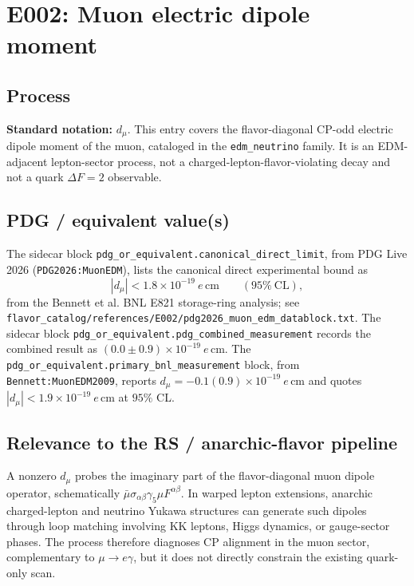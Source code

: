 
\section{E002: Muon electric dipole moment}

\subsection*{Process}
\textbf{Standard notation:} \(d_\mu\).  This entry covers the flavor-diagonal
CP-odd electric dipole moment of the muon, cataloged in the
\texttt{edm\_neutrino} family.  It is an EDM-adjacent lepton-sector process,
not a charged-lepton-flavor-violating decay and not a quark \(\Delta F=2\)
observable.

\subsection*{PDG / equivalent value(s)}
The sidecar block \texttt{pdg\_or\_equivalent.canonical\_direct\_limit}, from
PDG Live 2026 (\texttt{PDG2026:MuonEDM}), lists the canonical direct
experimental bound as
\[
  |d_\mu| < 1.8\times10^{-19}\ e\,\mathrm{cm}
  \qquad (95\%~\mathrm{CL}),
\]
from the Bennett et al. BNL E821 storage-ring analysis; see
\texttt{flavor\_catalog/references/E002/pdg2026\_muon\_edm\_datablock.txt}.
The sidecar block \texttt{pdg\_or\_equivalent.pdg\_combined\_measurement}
records the combined result as
\((0.0\pm0.9)\times10^{-19}\ e\,\mathrm{cm}\).  The
\texttt{pdg\_or\_equivalent.primary\_bnl\_measurement} block, from
\texttt{Bennett:MuonEDM2009}, reports
\(d_\mu=-0.1(0.9)\times10^{-19}\ e\,\mathrm{cm}\) and quotes
\(|d_\mu|<1.9\times10^{-19}\ e\,\mathrm{cm}\) at \(95\%\) CL.

\subsection*{Relevance to the RS / anarchic-flavor pipeline}
A nonzero \(d_\mu\) probes the imaginary part of the flavor-diagonal muon
dipole operator, schematically
\(\bar\mu\sigma_{\alpha\beta}\gamma_5\mu F^{\alpha\beta}\).  In warped
lepton extensions, anarchic charged-lepton and neutrino Yukawa structures can
generate such dipoles through loop matching involving KK leptons, Higgs
dynamics, or gauge-sector phases.  The process therefore diagnoses CP
alignment in the muon sector, complementary to \(\mu\to e\gamma\), but it does
not directly constrain the existing quark-only scan.

